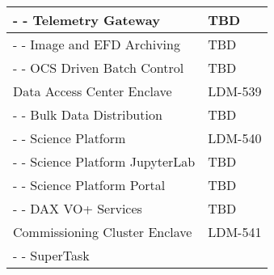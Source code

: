 \begin{longtable}{|p{}|p{}|}
- - Telemetry Gateway & TBD \\ \hline
- - Image and EFD Archiving & TBD \\ \hline
- - OCS Driven Batch Control & TBD \\ \hline
\rowcolor{orange}
Data Access Center Enclave & LDM-539 \\ \hline
- - Bulk Data Distribution & TBD \\ \hline
\rowcolor{yellow}
- - Science Platform & LDM-540 \\ \hline
- - Science Platform JupyterLab & TBD \\ \hline
- - Science Platform Portal & TBD \\ \hline
- - DAX VO+ Services & TBD \\ \hline
\rowcolor{orange}
Commissioning Cluster Enclave & LDM-541 \\ \hline
- - SuperTask &  \\ \hline
\end{longtable}

